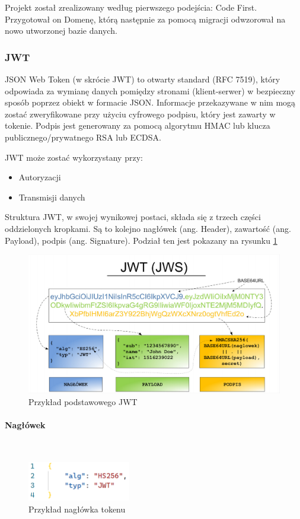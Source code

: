 \documentclass[12pt]{article}
\newcommand{\myparagraph}[1]{\paragraph{#1}\mbox{}\\}
\numberwithin{figure}{section}
\begin{document}
\begin{sloppypar}
Projekt został zrealizowany według pierwszego podejścia: Code First. Przygotował on Domenę, którą następnie za pomocą migracji odwzorował na nowo utworzonej bazie danych. 

\subsubsection{JWT}
JSON Web Token (w skrócie JWT) to otwarty standard (RFC 7519), który odpowiada za wymianę danych pomiędzy stronami (klient-serwer) w bezpieczny sposób poprzez obiekt w formacie JSON. Informacje przekazywane w nim mogą zostać zweryfikowane przy użyciu cyfrowego podpisu, który jest zawarty w tokenie. Podpis jest generowany za pomocą algorytmu HMAC lub klucza publicznego/prywatnego RSA lub ECDSA.
    
JWT może zostać wykorzystany przy:
\begin{itemize}
    \item Autoryzacji
    \item Transmisji danych
\end{itemize}
    
Struktura JWT, w swojej wynikowej postaci, składa się z trzech części oddzielonych kropkami. Są to kolejno nagłówek (ang. Header), zawartość (ang. Payload), podpis (ang. Signature). Podział ten jest pokazany na rysunku \ref{fig:jwt}
    
\begin{figure}[H] 
    \centering
    \includegraphics[width=1\textwidth]{images/chapter_3/jwt.png}
    \caption{Przykład podstawowego JWT \cite{sekurak-jwt}}
    \label{fig:jwt}
\end{figure}
    
    \myparagraph{Nagłówek}
    \begin{figure}[H] 
     	\centering
    	\includegraphics[width=0.4\textwidth]{images/chapter_3/jwt-header.png}
    	\caption{Przykład nagłówka tokenu}
    	\label{fig:jwt-header}
    \end{figure}
    

\end{sloppypar}
\end{document}

